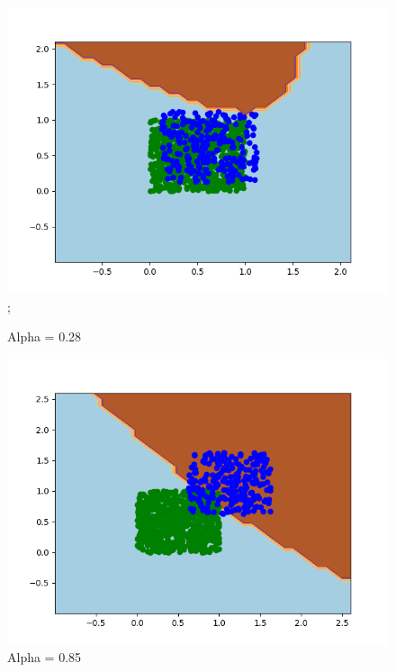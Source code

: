 \documentclass{article}
\begin{document}
\begin{figure}[!htb]
\begin{minipage}{0.24\textwidth}
		\includegraphics[scale=0.24]{../unequalpriors/this17.png};
	\caption{Alpha = 0.28}
	\end{minipage}
	\begin{minipage}{0.24\textwidth}
			\centering
			\includegraphics[scale=0.24]{../unequalpriors/this21.png}
			\caption{Alpha = 0.85}
	\end{minipage}
	\begin{minipage}{0.24\textwidth}
		\centering

\end{minipage}
\end{figure}
\end{document}
